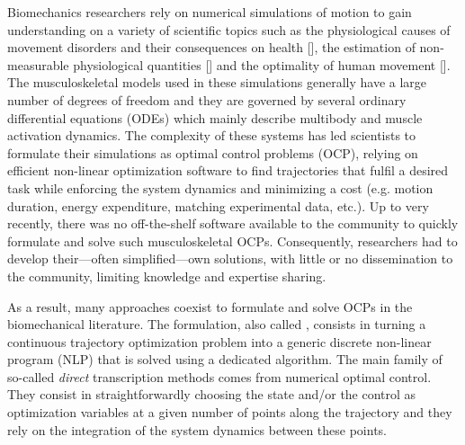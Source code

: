Biomechanics researchers rely on numerical simulations of motion to gain understanding on a variety of scientific topics such as the physiological causes of movement disorders and their consequences on health [\addref], the estimation of non-measurable physiological quantities [\addref] and the optimality of human movement [\addref].
The musculoskeletal models used in these simulations generally have a large number of degrees of freedom and they are governed by several ordinary differential equations (ODEs) which mainly describe multibody and muscle activation dynamics.
The complexity of these systems has led scientists to formulate their simulations as optimal control problems (OCP), relying on efficient non-linear optimization software to find trajectories that fulfil a desired task while enforcing the system dynamics and minimizing a cost (e.g. motion duration, energy expenditure, matching experimental data, etc.).
Up to very recently, there was no off-the-shelf software available to the community to quickly formulate and solve such musculoskeletal OCPs. 
Consequently, researchers had to develop their---often simplified---own solutions, with little or no dissemination to the community, limiting knowledge and expertise sharing.


As a result, many approaches coexist to formulate and solve OCPs in the biomechanical literature. 
The formulation, also called , consists in turning a continuous trajectory optimization problem into a generic discrete non-linear program (NLP) that is solved using a dedicated algorithm. 
The main family of so-called \textit{direct} transcription methods comes from numerical optimal control. 
They consist in straightforwardly choosing the state and/or the control as optimization variables at a given number of points along the trajectory and they rely on the integration of the system dynamics between these points. 


